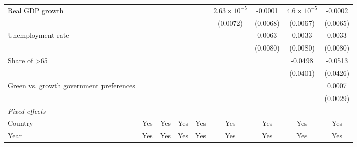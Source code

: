 \begin{table}[htbp]
\begin{tabular}{lcccccccc}
      Real GDP growth                                                       &          &          &                &                 & $2.63\times 10^{-5}$  & -0.0001         & $4.6\times 10^{-5}$  & -0.0002\\   
                                                                            &          &          &                &                 & (0.0072)              & (0.0068)        & (0.0067)             & (0.0065)\\   
      Unemployment rate                                                     &          &          &                &                 &                       & 0.0063          & 0.0033               & 0.0033\\   
                                                                            &          &          &                &                 &                       & (0.0080)        & (0.0080)             & (0.0080)\\   
      Share of >65                                                          &          &          &                &                 &                       &                 & -0.0498              & -0.0513\\   
                                                                            &          &          &                &                 &                       &                 & (0.0401)             & (0.0426)\\   
      Green vs. growth government preferences                               &          &          &                &                 &                       &                 &                      & 0.0007\\   
                                                                            &          &          &                &                 &                       &                 &                      & (0.0029)\\   
      \midrule
      \emph{Fixed-effects}\\
      Country                                                               & Yes      & Yes      & Yes            & Yes             & Yes                   & Yes             & Yes                  & Yes\\  
      Year                                                                  & Yes      & Yes      & Yes            & Yes             & Yes                   & Yes             & Yes                  & Yes\\  

\end{tabular}
\end{table}
